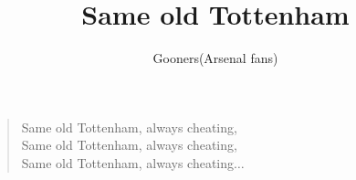 \documentclass[a4paper,12pt]{article}
\title{Same old Tottenham}
\author{Gooners(Arsenal fans)}
\date{}
\begin{document}
	
	\maketitle
	
	\begin{verse}
		
		Same old Tottenham, always cheating, \\
		Same old Tottenham, always cheating, \\
		Same old Tottenham, always cheating$\ldots$
		
	\end{verse}
	
\end{document}
